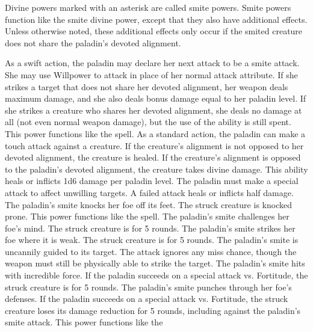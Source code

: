 Divine powers marked with an asterisk are called smite powers.
Smite powers function like the smite divine power, except that they also have additional effects.
Unless otherwise noted, these additional effects only occur if the smited creature does not share the paladin's devoted alignment.


As a swift action, the paladin may declare her next attack to be a smite attack.
She may use Willpower to attack in place of her normal attack attribute.
If she strikes a target that does not share her devoted alignment, her weapon deals maximum damage, and she also deals bonus damage equal to her paladin level.
If she strikes a creature who shares her devoted alignment, she deals no damage at all (not even normal weapon damage), but the use of the ability is still spent.
 This power functions like the 
spell.
As a standard action, the paladin can make a touch attack against a creature.
If the creature's alignment is not opposed to her devoted alignment, the creature is healed.
If the creature's alignment is opposed to the paladin's devoted alignment, the creature takes divine damage.
This ability heals or inflicts 1d6 damage per paladin level.
The paladin must make a special attack to affect unwilling targets.
A failed attack heals or inflicts half damage.
The paladin's smite knocks her foe off its feet.
The struck creature is knocked prone.
 This power functions like the 
spell.
The paladin's smite challenges her foe's mind.
The struck creature is \bewildered for 5 rounds.
The paladin's smite strikes her foe where it is weak.
The struck creature is \sickened for 5 rounds.
The paladin's smite is uncannily guided to its target.
The attack ignores any miss chance, though the weapon must still be physically able to strike the target.
The paladin's smite hits with incredible force.
If the paladin succeeds on a special attack vs. Fortitude, the struck creature is \staggered for 5 rounds.
The paladin's smite punches through her foe's defenses.
If the paladin succeeds on a special attack vs. Fortitude, the struck creature loses its damage reduction for 5 rounds, including against the paladin's smite attack.
 This power functions like the 
